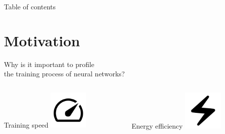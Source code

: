 \documentclass[compress,aspectratio=169]{beamer}
\title{\Large \mytitle}
\date{\mydate}
\subtitle{\mysubtitle}
\author{{\myauthor}}
\institute{\myinstitute}
\begin{document}
\begin{frame}[plain]
	\titlepage
\end{frame}

\begin{frame}[t]{Table of contents}
  \tableofcontents[subsectionstyle=hide/hide]
\end{frame}


\section{Motivation}

\begin{frame}{Why is it important to profile\\the training process of neural networks?}

    \begin{columns}
        \begin{column}{0.5\textwidth}
            \begin{block}{\centering Training speed}
                \centering
                \vspace{3em}
                \includegraphics[width=0.3\textwidth]{assets/speed_FILL0_wght400_GRAD0_opsz48.png}
            \end{block}
        \end{column}
        \begin{column}{0.5\textwidth}
            \begin{block}{\centering Energy efficiency}
                \centering
                \vspace{3em}
                \includegraphics[width=0.3\textwidth]{assets/electric_bolt_FILL0_wght400_GRAD0_opsz48}
            \end{block}
        \end{column}
    \end{columns}

\end{frame}
\end{document}
